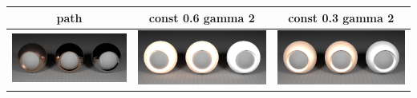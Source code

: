 \documentclass[11pt]{article}
\begin{document}
\begin{table}[ht]
  \centering
  \begin{tabular}{ | c | c | c |}
    \hline
    path & const 0.6 gamma 2 & const 0.3 gamma 2 \\ \hline
    \begin{minipage}{.3\textwidth}
      \includegraphics[scale=0.1]{img/obj/metals_al/metals_al.jpg}
    \end{minipage}
    &
    \begin{minipage}{.3\textwidth}
      \includegraphics[scale=0.1]{img/obj/metals_al/metals_al_disney.jpg}
    \end{minipage}
    & 
    \begin{minipage}{.3\textwidth}
      \includegraphics[scale=0.1]{img/obj/metals_al/metals_al_disney_dc03.jpg}
    \end{minipage}
    \\ \hline
  \end{tabular}
\end{table}
\end{document}
